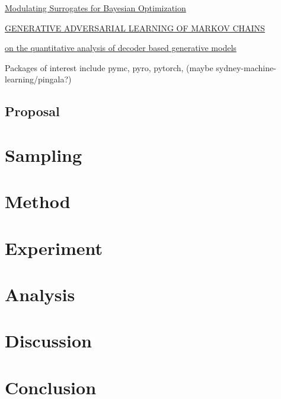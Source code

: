 \documentclass[honours,12pt]{unswthesis}
\numberwithin{equation}{section}
\begin{document}
\href{https://icml.cc/virtual/2020/poster/6028}{Modulating Surrogates for Bayesian Optimization}

\href{https://github.com/ermongroup/markov-chain-gan}{GENERATIVE ADVERSARIAL LEARNING
OF MARKOV CHAINS
}

\href{google search}{ on the quantitative analysis of decoder based generative models}

\noindent Packages of interest include pymc, pyro, pytorch, (maybe  sydney-machine-learning/pingala?)

\section{Proposal}



\chapter{Sampling}\label{samp}






\chapter{Method}\label{meth}




\chapter{Experiment}\label{expe}


\chapter{Analysis}\label{anal}


\chapter{Discussion}\label{disc}

\chapter{Conclusion}\label{conc}




\clearpage


\end{document}
